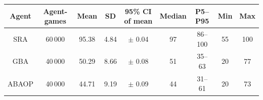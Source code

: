 \begin{tabular}{|c|c|c|c|c|c|c|c|c|}
\hline
\rowcolor{blue!20}
Agent & Agent-games & Mean & SD & 95\% CI of mean & Median & P5--P95 & Min & Max \\ \hline
SRA & 60\,000 & 95.38 & 4.84 & $\pm$ 0.04 & 97 & 86--100 & 55 & 100 \\ \hline
GBA & 40\,000 & 50.29 & 8.66 & $\pm$ 0.08 & 51 & 35--63 & 20 & 77 \\ \hline
ABAOP & 40\,000 & 44.71 & 9.19 & $\pm$ 0.09 & 44 & 31--61 & 20 & 73 \\ \hline
\end{tabular}
